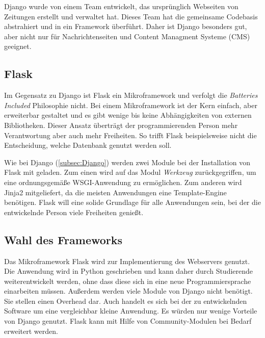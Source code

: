 Django wurde von einem Team entwickelt, das ursprünglich Webseiten von Zeitungen erstellt und verwaltet hat. Dieses Team hat die gemeinsame Codebasis abstrahiert und in ein Framework überführt. Daher ist Django besonders gut, aber nicht nur für Nachrichtenseiten und Content Managment Systeme (CMS) geeignet. \cite{mdncontributorsDjangoIntroduction2019}

\subsection{Flask}
Im Gegensatz zu Django ist Flask ein Mikroframework und verfolgt die \textit{Batteries Included} Philosophie nicht. Bei einem Mikroframework ist der Kern einfach, aber erweiterbar gestaltet und es gibt wenige bis keine Abhängigkeiten von externen Bibliotheken. Dieser Ansatz überträgt der programmierenden Person mehr Verantwortung aber auch mehr Freiheiten. So trifft Flask beispielsweise nicht die Entscheidung, welche Datenbank genutzt werden soll. \cite{palletsForewordFlaskDocumentation2010} 

Wie bei Django (\autoref{subsec:Django}) werden zwei Module bei der Installation von Flask mit geladen. Zum einen wird auf das Modul \textit{Werkzeug} zurückgegriffen, um eine ordnungsgemäße WSGI-Anwendung zu ermöglichen. Zum anderen wird Jinja2 mitgeliefert, da die meisten Anwendungen eine Template-Engine benötigen.
Flask will eine solide Grundlage für alle Anwendungen sein, bei der die entwickelnde Person viele Freiheiten genießt. \cite{palletsDesignDecisionsFlask2010}

\subsection{Wahl des Frameworks}

Das Mikroframework Flask wird zur Implementierung des Webservers genutzt. Die Anwendung wird in Python geschrieben und kann daher durch Studierende weiterentwickelt werden, ohne dass diese sich in eine neue Programmiersprache einarbeiten müssen. Außerdem werden viele Module von Django nicht benötigt. Sie stellen einen Overhead dar. Auch handelt es sich bei der zu entwickelnden Software um eine vergleichbar kleine Anwendung. Es würden nur wenige Vorteile von Django genutzt. Flask kann mit Hilfe von Community-Modulen bei Bedarf erweitert werden.
